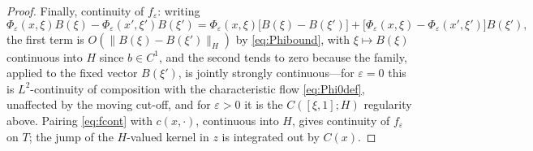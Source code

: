\documentclass[10pt,a4paper]{amsart}
\newcommand{\Hs}{H}
\begin{document}
\begin{proof}
Finally, continuity of $f_\varepsilon$: writing
\begin{equation}
 \Phi_\varepsilon(x,\xi)B(\xi)-\Phi_\varepsilon(x',\xi')B(\xi')
 =\Phi_\varepsilon(x,\xi)\big[B(\xi)-B(\xi')\big]
 +\big[\Phi_\varepsilon(x,\xi)-\Phi_\varepsilon(x',\xi')\big]B(\xi'),
 \label{eq:fcont}
\end{equation}
the first term is $O(\|B(\xi)-B(\xi')\|_\Hs)$ by \eqref{eq:Phibound}, with $\xi\mapsto B(\xi)$ continuous into $\Hs$ since $b\in C^1$, and the second tends to zero because the family, applied to the fixed vector $B(\xi')$, is jointly strongly continuous---for $\varepsilon=0$ this is $L^2$-continuity of composition with the characteristic flow \eqref{eq:Phi0def}, unaffected by the moving cut-off, and for $\varepsilon>0$ it is the $C([\xi,1];\Hs)$ regularity above. Pairing \eqref{eq:fcont} with $c(x,\cdot)$, continuous into $\Hs$, gives continuity of $f_\varepsilon$ on $T$; the jump of the $\Hs$-valued kernel in $z$ is integrated out by $C(x)$.
\end{proof}
\end{document}
